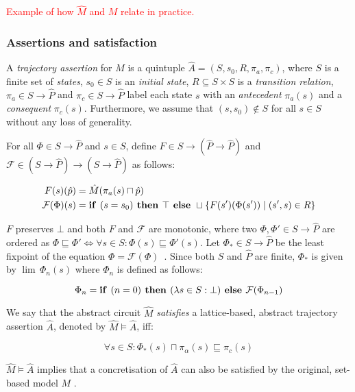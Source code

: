 \textcolor{red}{Example of how $\hat M$ and $M$ relate in practice.}

\subsubsection{Assertions and satisfaction} A \textit{trajectory assertion} for $\hat M$ is a quintuple $\hat A = (S,s_{0},R,\pi_{a},\pi_{c})$, where $S$ is a finite set of \textit{states}, $s_{0} \in S$ is an \textit{initial state}, $R \subseteq S \times S$ is a \textit{transition relation}, $\pi_{a} \in S \rightarrow \hat P$ and $\pi_{c} \in S \rightarrow \hat P$ label each state $s$ with an \textit{antecedent} $\pi_{a}(s)$ and a \textit{consequent} $\pi_{c}(s)$. Furthermore, we assume that $(s,s_{0}) \notin S$ for all $s \in S$ without any loss of generality.

For all $\Phi \in S \rightarrow \hat P$ and $s \in S$, define $F \in S \rightarrow (\hat P \rightarrow \hat P)$ and $\mathcal{F} \in (S \rightarrow \hat P) \rightarrow (S \rightarrow \hat P)$ as follows:

\begin{align}
F(s)(\hat p) &= \hat M(\pi_{a}(s) \sqcap \hat p) \\
\mathcal{F}(\Phi)(s) &= \textrm{\textbf{if }} (s = s_{0}) \textrm{\textbf{ then }} \top \textrm{\textbf{ else }} \sqcup \{ F(s')(\Phi(s')) \mid (s',s) \in R \}
\end{align}



\noindent $F$ preserves $\bot$ and both $F$ and $\mathcal{F}$ are monotonic, where two $\Phi, \Phi' \in S \rightarrow \hat P$ are ordered as $\Phi \sqsubseteq \Phi' \iff \forall s \in S : \Phi(s) \sqsubseteq \Phi'(s)$. Let $\Phi_{*} \in S \rightarrow \hat P$ be the least fixpoint of the equation $\Phi = \mathcal{F}(\Phi)$~\cite{davey2002}. Since both $S$ and $\hat P$ are finite, $\Phi_{*}$ is given by $\lim \, \Phi_{n}(s)$ where $\Phi_{n}$ is defined as follows:

\begin{equation}
\Phi_{n} = \textrm{\textbf{if }} (n = 0) \textrm{\textbf{ then }} (\lambda s \in S : \bot) \textrm{\textbf{ else }} \mathcal{F}(\Phi_{n-1})
\end{equation}

We say that the abstract circuit $\hat M$ \textit{satisfies} a lattice-based, abstract trajectory assertion $\hat A$, denoted by $\hat M \models \hat A$, iff:

\begin{equation}
\forall s \in S : \Phi_{*}(s) \sqcap \pi_{\alpha}(s) \sqsubseteq \pi_{c}(s)
\end{equation}

\noindent $\hat M \models \hat A$ implies that a concretisation of $\hat A$ can also be satisfied by the original, set-based model $M$ \cite{chou1999}.
